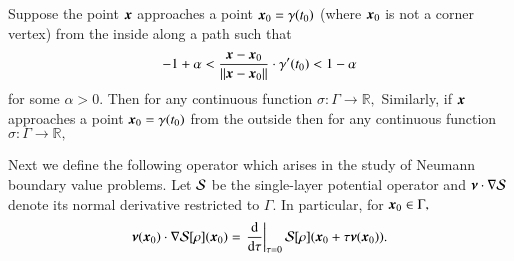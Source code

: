 \begin{theorem}\label{thm:potlim}
Suppose the point $\boldsymbol{x}$ approaches a point $\boldsymbol{x}_0 = \gamma(t_0)$ (where $\boldsymbol{x}_{0}$ is not a corner vertex) from the inside along a path such that 
\begin{align}
-1+\alpha<\frac{\boldsymbol{x}-\boldsymbol{x}_0}{\|\boldsymbol{x}-\boldsymbol{x}_0\|} \cdot \gamma'(t_0) <1-\alpha
\end{align}
for some $\alpha >0.$ Then for any continuous function $\sigma:\Gamma \to \mathbb{R},$
 Similarly, if $\boldsymbol{x}$ approaches a point $\boldsymbol{x}_0 = \gamma(t_0)$ from the outside then for any continuous function $\sigma:\Gamma \to \mathbb{R},$
\end{theorem}

Next we define the following operator which arises in the study of Neumann boundary value problems.
Let $\mathcal{S}$ be the single-layer potential operator and $\boldsymbol{\nu}\cdot \nabla \mathcal{S}$  denote its normal derivative restricted to $\Gamma.$ In particular, for $\boldsymbol{x}_0 \in \Gamma,$
\begin{align}
\boldsymbol{\nu}(\boldsymbol{x}_0)\cdot \nabla \mathcal{S}[\rho] (\boldsymbol{x}_0) = \left.\frac{{\rm d}}{{\rm d}\tau}\right|_{\tau = 0} \mathcal{S}[\rho](\boldsymbol{x}_0 + \tau \boldsymbol{\nu}(\boldsymbol{x}_0)).
\end{align}

